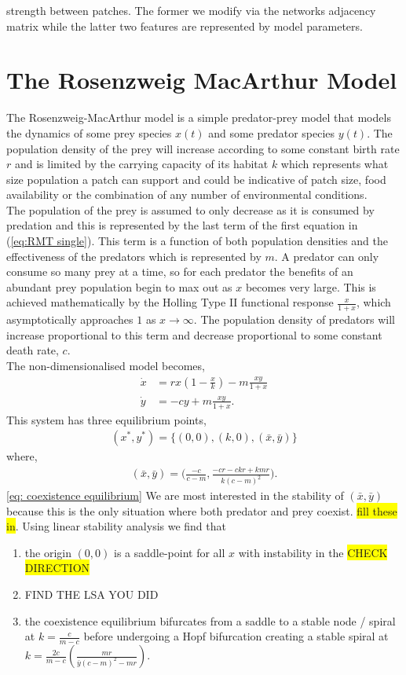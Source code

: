 \documentclass[12pt]{article}
\begin{document}
strength between patches. The former we modify via the networks adjacency matrix while the latter two features are represented by model parameters.

\section{The Rosenzweig MacArthur Model}\label{section: model intro}
The Rosenzweig-MacArthur model \cite{rosenzweig1963} is a simple predator-prey model that models the dynamics of some prey species $x(t)$ and some predator species $y(t)$. The population density of the prey will increase according to some constant birth rate $r$ and is limited by the carrying capacity of its habitat $k$ which represents what size population a patch can support and could be indicative of patch size, food availability or the combination of any number of environmental conditions. \\
The population of the prey is assumed to only decrease as it is consumed by predation and this is represented by the last term of the first equation in (\ref{eq:RMT single}). This term is a function of both population densities and the effectiveness of the predators which is represented by $m$. A predator can only consume so many prey at a time, so for each predator the benefits of an abundant prey population begin to max out as $x$ becomes very large. This is achieved mathematically by the Holling Type II functional response $\frac{x}{1+x}$, which asymptotically approaches $1$ as $x \to \infty$. The population density of predators will increase proportional to this term and decrease proportional to some constant death rate, $c$. \\
The non-dimensionalised model becomes,
\begin{align}
    \dot{x} &= r x \left(1 - \frac{x}{k}\right) - m \frac{x y}{1+x} \\
    \dot{y} &= -c y + m \frac{x y}{1 + x} .
\end{align}\label{eq:RMT single}
This system has three equilibrium points,
\begin{align*}
    (x^*,y^*) =  \bigg\{ (0,0), (k,0),(\bar{x},\bar{y}) \bigg\}
    \end{align*}
where,
\begin{align}
(\bar{x},\bar{y}) = \Big(\frac{-c}{c-m},\frac{-cr - ckr +kmr}{k(c-m)^2}\Big).
\end{align} \ref{eq: coexistence equilibrium}
We are most interested in the stability of $(\bar{x},\bar{y})$ because this is the only situation where both predator and prey coexist.
\colorbox{yellow}{fill these in}.
Using linear stability analysis we find that
\begin{enumerate}
    \item the origin $(0,0)$ is a saddle-point for all $x$ with instability in the \colorbox{yellow}{CHECK DIRECTION}
    \item FIND THE LSA YOU DID
    \item the coexistence equilibrium bifurcates from a saddle to a stable node / spiral at $k= \frac{c}{m-c} $ before undergoing a Hopf bifurcation creating a stable spiral at $k = \frac{2c}{m-c}\left(\frac{m r}{\bar{y}(c-m)^2 - mr}\right)$.
\end{enumerate}
\end{document}
